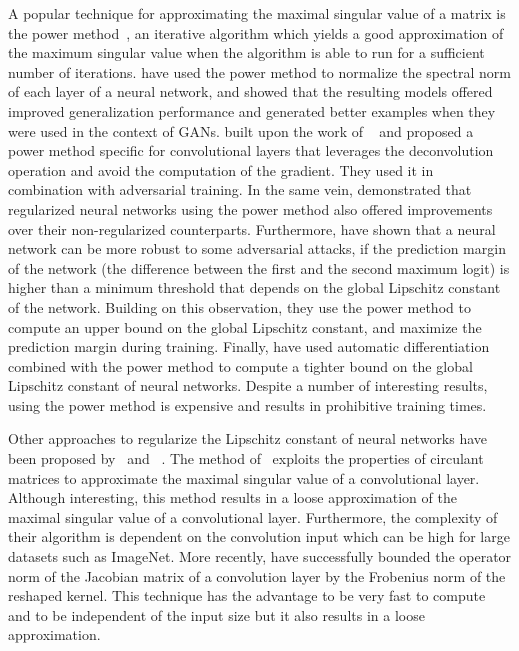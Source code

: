 A popular technique for approximating the maximal singular value of a matrix is the power method~\cite{golub2000eigenvalue}, an iterative algorithm which yields a good approximation of the maximum singular value when the algorithm is able to run for a sufficient number of iterations. 
\cite{yoshida2017spectral, miyato2018spectral} have used the power method to normalize the spectral norm of each layer of a neural network, and showed that the resulting models offered improved generalization performance and generated better examples when they were used in the context of GANs. 
\cite{farnia2018generalizable} built upon the work of ~\cite{miyato2018spectral} and proposed a power method specific for convolutional layers that leverages the deconvolution operation and avoid the computation of the gradient.
They used it in combination with adversarial training. 
In the same vein, \cite{gouk2018regularisation} demonstrated that regularized neural networks using the power method also offered improvements over their non-regularized counterparts. 
Furthermore, \cite{tsuzuku2018lipschitz} have shown that a neural network can be more robust to some adversarial attacks,  if the prediction margin of the network (\ie the difference between the first and the second maximum logit) is higher than a minimum threshold that depends on the global Lipschitz constant of the network.
Building on this observation, they use the power method to compute an upper bound on the global Lipschitz constant, and maximize the prediction margin during training.
Finally, \cite{scaman2018lipschitz} have used automatic differentiation combined with the power method to compute a tighter bound on the global Lipschitz constant of neural networks.
Despite a number of interesting results, using the power method is expensive and results in prohibitive training times. 

Other approaches to regularize the Lipschitz constant of neural networks have been proposed by~\cite{sedghi2018the} and ~\cite{singla2019bounding}.
The method of~\cite{sedghi2018the} exploits the properties of circulant matrices to approximate the maximal singular value of a convolutional layer.
Although interesting, this method results in a loose approximation of the maximal singular value of a convolutional layer.
Furthermore, the complexity of their algorithm is dependent on the convolution input which can be high for large datasets such as ImageNet.
More recently, \cite{singla2019bounding} have successfully bounded the operator norm of the Jacobian matrix of a convolution layer by the Frobenius norm of the reshaped kernel.
This technique has the advantage to be very fast to compute and to be independent of the input size but it also results in a loose approximation. 

